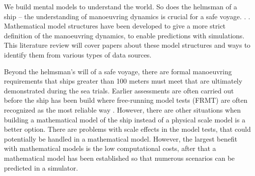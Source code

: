 We build mental models to understand the world. So does the helmsman of a ship – the understanding of manoeuvring dynamics is crucial for a safe voyage.  \cite{ljungModelingIdentificationDynamic2021}.  \cite{ljungPerspectivesSystemIdentification2010}.
Mathematical model structures have been developed to give a more strict definition of the manoeuvring dynamics, to enable predictions with simulations. This literature review will cover papers about these model structures and ways to identify them from various types of data sources.

Beyond the helmsman's will of a safe voyage, there are formal manoeuvring requirements that ships greater than 100 meters must meet  \cite{imoStandardsShipManoeuvrability2002} that are ultimately demonstrated during the sea trials. Earlier assessments are often carried out before the ship has been build where free-running model tests (FRMT) are often recognized as the most reliable way \cite{ittcManeuveringCommitteeITTC2008}. However, there are other situations when building a mathematical model of the ship instead of a physical scale model is a better option.  There are problems with scale effects in the model tests, that could potentially be handled in a mathematical model.  However, the largest benefit with mathematical models is the low  computational costs, after that a mathematical model has been established so that numerous scenarios can be predicted in a simulator.

